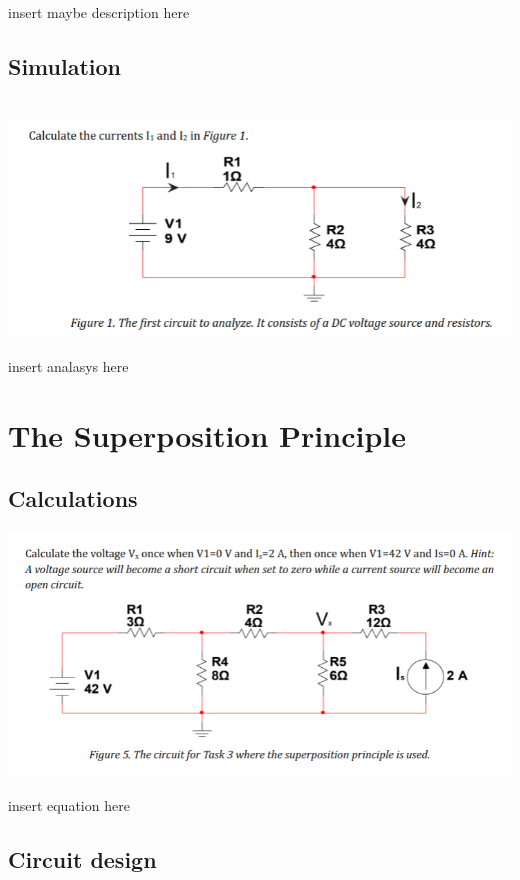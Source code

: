 \documentclass[11pt]{article}
\begin{document}
insert maybe description here

\subsection[25pt]{\bf{Simulation}}

\noindent
\\
\includegraphics[width=\linewidth]{1.1 calculation.png}

insert analasys here


\section{\bf{The Superposition Principle}}

\subsection[25pt]{\bf{Calculations}}

\includegraphics[width=\linewidth]{3.1 calculations.png}


\noindent
insert equation here

\subsection[25pt]{\bf{Circuit design}}
\end{document}

